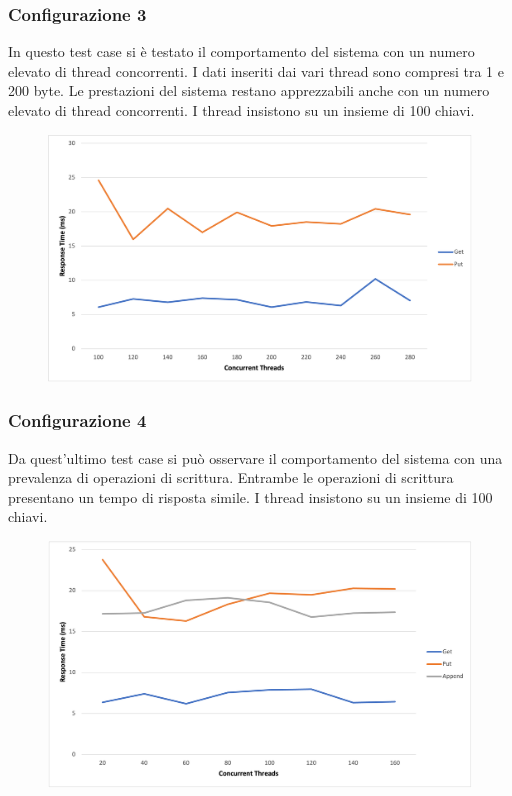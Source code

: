 \documentclass[conference]{IEEEtran}
\begin{document}
\subsubsection{Configurazione 3}
In questo test case si è testato il comportamento del sistema con un numero elevato di thread concorrenti. I dati inseriti
dai vari thread sono compresi tra 1 e 200 byte. Le prestazioni del sistema restano apprezzabili anche con un numero elevato di thread concorrenti.
I thread insistono su un insieme di 100 chiavi.
\begin{figure}[H]
  \includegraphics[scale=0.4]{images/stress.png}
\end{figure}

\subsubsection{Configurazione 4}
Da quest'ultimo test case si può osservare il comportamento del sistema con una prevalenza di operazioni di scrittura.
Entrambe le operazioni di scrittura presentano un tempo di risposta simile.
I thread insistono su un insieme di 100 chiavi.
\begin{figure}[H]
  \includegraphics[scale=0.4]{images/conf3.png}
\end{figure}
\end{document}
